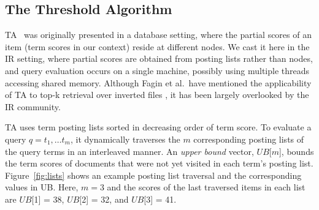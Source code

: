 \subsection{The Threshold Algorithm}

TA~\cite{Fagin:2003} was originally presented in a database setting, where the partial scores of an item (term scores  in our context)  reside at different nodes. We cast it here in the IR setting, where partial scores are obtained from posting lists rather than nodes, and query evaluation occurs on a single machine, possibly using multiple threads accessing shared memory. Although Fagin et al.\ have mentioned the applicability of TA to top-k retrieval over inverted files \cite{Fagin:2001}, it has been largely overlooked by the IR community.

TA uses  term posting lists sorted in decreasing order of term score. 
To evaluate a query $q = t_1, \dots t_m$, it dynamically traverses the $m$ corresponding posting lists of the query terms in an interleaved manner. 
An \emph{upper bound} vector, $UB$[$m$], 
bounds the term scores of documents that were not yet visited in each term's posting list. 
%
Figure~\ref{fig:lists} shows
an example posting list traversal and the corresponding values in UB. Here, $m=3$ and the scores of the last traversed items in each list are $UB$[1] = 38, $UB$[2] = 32, and $UB$[3] = 41. 



